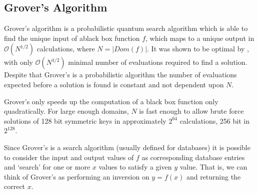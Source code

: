 \bigskip    
\subsection{Grover's Algorithm}


Grover’s algorithm is a probabilistic quantum search algorithm which is able to find the unique input of a\gls{black box} function $f$, which maps to a unique output in $\mathcal{O}(N^{1/2})$ calculations, 
where $N = |Dom(f)|$. 
It was shown to be optimal by \cite{Ben1997}, with only $\mathcal{O}(N^{1/2})$ minimal number of evaluations required to find a solution. Despite that Grover’s is a probabilistic algorithm the number of evaluations expected before a solution is found is constant and not dependent upon $N$. 

Grover's only speeds up the computation of a black box function only quadratically. For large enough domains, $N$ is fast enough to allow brute force solutions of 128 bit symmetric keys in approximately $2^{64}$ calculations, 256 bit in $2^{128}$. 

Since Grover’s is a search algorithm (usually defined for databases) it is possible to consider the input and output values of $f$ as corresponding database entries and `search’ for one or more $x$ values to satisfy a given $y$ value. That is, we can think of Grover’s as performing an inversion on $y=f(x)$ and returning the correct $x$. 



	